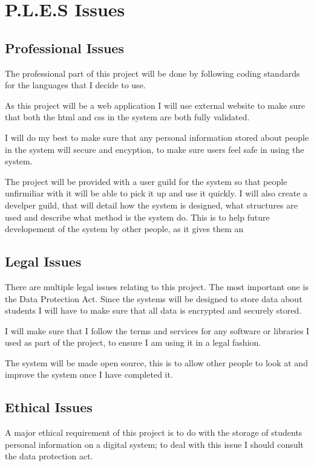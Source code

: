 \documentclass[12pt]{article}  %
\begin{document}
\newpage


\section{P.L.E.S Issues}


\subsection{Professional Issues}
The professional part of this project will be done by following coding standards for the languages that I decide to use.

As this project will be a web application I will use external website to make sure that both the html and css in the system are both fully validated.


I will do my best to make sure that any personal information stored about people in the system will secure and encyption, to make sure users feel safe in using the system. 

The project will be provided with a  user guild for the system so that people unfirmiliar with it will be able to pick it up and use it quickly. I will also create  a develper guild, that will detail how the system is designed, what structures are used and describe what method is the system do. This is to help future developement of the system by other people, as it gives them an 


\subsection{Legal Issues}
There are multiple legal issues relating to this project. The most important one is the Data Protection Act. Since the systems will be designed to store data about students I will have to make sure that all data is encrypted and securely stored.

I will make sure that I follow the terms and services for any software or libraries I used as part of the project, to ensure I am using it in a legal fashion.


The system will be made open source, this is to allow other people to look at and improve the system once I have completed it. 


\subsection{Ethical Issues}
A major ethical requirement of this project is to do with the storage of students personal information on a digital system; to deal with this issue I should consult the data protection act.
\end{document}
